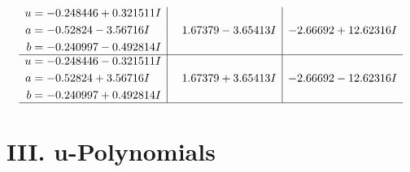 \documentclass[1p]{elsarticle_modified}
\theoremstyle{definition}
\begin{document}
$$\begin{array}{c|c|c}
\begin{aligned}
u &= -0.248446 + 0.321511 I \\
a &= -0.52824 - 3.56716 I \\
b &= -0.240997 - 0.492814 I\end{aligned}
 & \phantom{-}1.67379 - 3.65413 I & -2.66692 + 12.62316 I \\ \hline\begin{aligned}
u &= -0.248446 - 0.321511 I \\
a &= -0.52824 + 3.56716 I \\
b &= -0.240997 + 0.492814 I\end{aligned}
 & \phantom{-}1.67379 + 3.65413 I & -2.66692 - 12.62316 I\\
 \hline 
 \end{array}$$\newpage
\newpage\renewcommand{\arraystretch}{1}
\centering \section*{ III. u-Polynomials}
\end{document}
